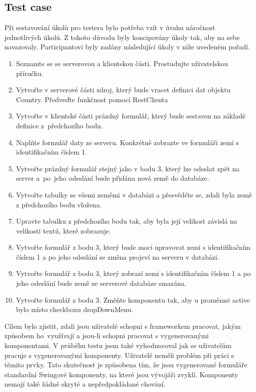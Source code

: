 \subsection{Test case}
Při sestavování úkolů pro testera bylo potřeba vzít v úvahu náročnost jednotlivých úkolů. Z tohoto důvodu byly koncipovány úkoly tak, aby na sebe navazovaly. Participantovi byly zadány následující úkoly v níže uvedeném pořadí.
\begin{enumerate}
\item Seznamte se se serverovou a klientskou částí. Prostudujte uživatelskou příručku.
\item Vytvořte v serverové části zdroj, který bude vracet definici dat objektu Country. Předveďte funkčnost pomocí RestClienta
\item Vytvořte v klientské části prázdný formulář, který bude sestaven na základě definice z~předchozího bodu.
\item Naplňte formulář daty ze serveru. Konkrétně zobrazte ve formuláři zemi s identifikačním číslem 1.
\item Vytvořte prázdný formulář stejný jako v bodu 3, který lze odeslat zpět na server a~po~jeho odeslání bude přidána nová země do databáze.
\item Vytvořte tabulky se všemi zeměmi v databázi a přesvědčte se, zdali byla země z předchozího bodu vložena.
\item Upravte tabulku z předchozího bodu tak, aby byla její velikost závislá na velikosti textů, které zobrazuje.
\item Vytvořte formulář z bodu 3, který bude moci upravovat zemi s identifikačním číslem 1 a po jeho odeslání se změna projeví na serveru v databázi.
\item Vytvořte formulář z bodu 3, který zobrazí zemi s identifikačním číslem 1 a po jeho odeslání bude země ze serverové databáze smazána.
\item Vytvořte formulář z bodu 3. Změňte komponentu tak, aby u proměnné active bylo místo checkboxu dropDownMenu.
\end{enumerate}
Cílem bylo zjistit, zdali jsou uživatelé schopni s frameworkem pracovat, jakým způsobem ho~využívají a jsou-li schopni pracovat s vygenerovanými komponentami. V průběhu testu jsem také vyhodnocoval jak se uživatelům pracuje s vygenerovanými komponenty. Uživatelé neměli problém při práci s těmito prvky. Tato skutečnost je způsobena tím, že jsou vygenerované formuláře standardní Swingové komponenty, na které jsou vývojáři zvyklí. Komponenty nemají také žádné skryté a nepředpokládané chování.
